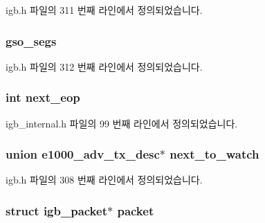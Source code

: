 igb.\+h 파일의 311 번째 라인에서 정의되었습니다.

\subsubsection[{\texorpdfstring{gso\+\_\+segs}{gso_segs}}]{ gso\+\_\+segs}\hypertarget{structigb__tx__buffer_a6c470eb193221275df0074f1af9faa47}{}\label{structigb__tx__buffer_a6c470eb193221275df0074f1af9faa47}


igb.\+h 파일의 312 번째 라인에서 정의되었습니다.

\subsubsection[{\texorpdfstring{next\+\_\+eop}{next_eop}}]{\setlength{\rightskip}{0pt plus 5cm}int next\+\_\+eop}\hypertarget{structigb__tx__buffer_af565101ee13ca100904a7ac5b7564a3d}{}\label{structigb__tx__buffer_af565101ee13ca100904a7ac5b7564a3d}


igb\+\_\+internal.\+h 파일의 99 번째 라인에서 정의되었습니다.

\subsubsection[{\texorpdfstring{next\+\_\+to\+\_\+watch}{next_to_watch}}]{\setlength{\rightskip}{0pt plus 5cm}union {\bf e1000\+\_\+adv\+\_\+tx\+\_\+desc}$\ast$ next\+\_\+to\+\_\+watch}\hypertarget{structigb__tx__buffer_a98ad5fb04406aff9d2b4b6eea9db689f}{}\label{structigb__tx__buffer_a98ad5fb04406aff9d2b4b6eea9db689f}


igb.\+h 파일의 308 번째 라인에서 정의되었습니다.

\subsubsection[{\texorpdfstring{packet}{packet}}]{\setlength{\rightskip}{0pt plus 5cm}struct {\bf igb\+\_\+packet}$\ast$ packet}\hypertarget{structigb__tx__buffer_ac6186670bb595d9f22c89b6dc2779d14}{}\label{structigb__tx__buffer_ac6186670bb595d9f22c89b6dc2779d14}


